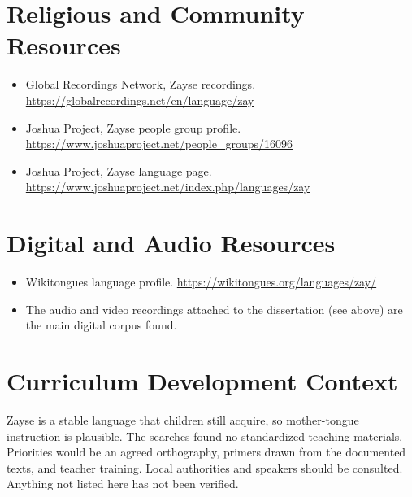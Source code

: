\documentclass[12pt]{article}
\begin{document}
\section{Religious and Community Resources}
\begin{itemize}
\item Global Recordings Network, Zayse recordings. \url{https://globalrecordings.net/en/language/zay}
\item Joshua Project, Zayse people group profile. \url{https://www.joshuaproject.net/people_groups/16096}
\item Joshua Project, Zayse language page. \url{https://www.joshuaproject.net/index.php/languages/zay}
\end{itemize}

\section{Digital and Audio Resources}
\begin{itemize}
\item Wikitongues language profile. \url{https://wikitongues.org/languages/zay/}
\item The audio and video recordings attached to the dissertation (see above) are the main digital corpus found.
\end{itemize}

\section{Curriculum Development Context}
Zayse is a stable language that children still acquire, so mother-tongue instruction is plausible. The searches found no standardized teaching materials. Priorities would be an agreed orthography, primers drawn from the documented texts, and teacher training. Local authorities and speakers should be consulted. Anything not listed here has not been verified.
\end{document}
